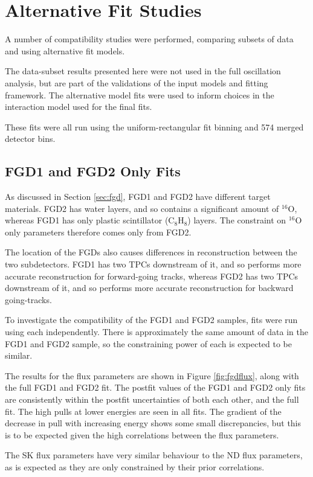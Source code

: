 \chapter{Alternative Fit Studies}

A number of compatibility studies were performed, comparing subsets of data and using alternative fit models.

The data-subset results presented here were not used in the full oscillation analysis, but are part of the validations of the input models and fitting framework. The alternative model fits were used to inform choices in the interaction model used for the final fits.

These fits were all run using the uniform-rectangular fit binning and 574 merged detector bins.

\section{FGD1 and FGD2 Only Fits}

As discussed in Section \ref{sec:fgd}, FGD1 and FGD2 have different target materials. FGD2 has water layers, and so contains a significant amount of $^{16}$O, whereas FGD1 has only plastic scintillator (C$_8$H$_8$) layers. The constraint on $^{16}$O only parameters therefore comes only from FGD2. 

The location of the FGDs also causes differences in reconstruction between the two subdetectors. FGD1 has two TPCs downstream of it, and so performs more accurate reconstruction for forward-going tracks, whereas FGD2 has two TPCs downstream of it, and so performs more accurate reconstruction for backward going-tracks.

To investigate the compatibility of the FGD1 and FGD2 samples, fits were run using each independently. There is approximately the same amount of data in the FGD1 and FGD2 sample, so the constraining power of each is expected to be similar.

The results for the flux parameters are shown in Figure \ref{fig:fgdflux}, along with the full FGD1 and FGD2 fit. The postfit values of the FGD1 and FGD2 only fits are consistently within the postfit uncertainties of both each other, and the full fit. The high pulls at lower energies are seen in all fits. The gradient of the decrease in pull with increasing energy shows some small discrepancies, but this is to be expected given the high correlations between the flux parameters.

The SK flux parameters have very similar behaviour to the ND flux parameters, as is expected as they are only constrained by their prior correlations.

